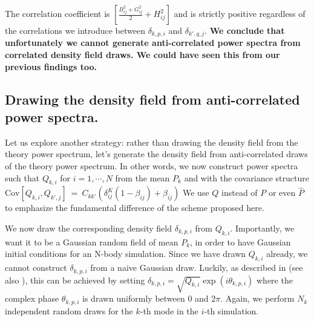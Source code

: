 \documentclass{aastex6}
\newcommand{\eqn}[1]{\begin{eqnarray}#1\end{eqnarray}}
\begin{document}
 

The correlation coefficient is $\left[  \frac{B^2_{ij} + G^2_{ij}}{2}  + H^2_{ij}\right]$ and is strictly positive regardless of the correlations we introduce between $\delta_{k, p, i}$ and $\delta_{k', q, j}$.
\textbf{We conclude that unfortunately we cannot generate anti-correlated power spectra from correlated density field draws. We could have seen this from our previous findings too.}


\subsection{Drawing the density field from anti-correlated power spectra.}

Let us explore another strategy: rather than drawing the density field from the theory power spectrum, let's generate the density field from anti-correlated draws of the theory power spectrum. 
In other words, we now construct power spectra such that $Q_{k, i}$ for $i=1, \cdots, N$ from the mean $P_{k}$ and with the covariance structure $\mathrm{Cov}[{Q}_{k, i}, {Q}_{k', j}] \ = \ C_{kk'} \left( \delta^K_{ij}(1-\beta_{ij}) + \beta_{ij} \right)$
We use $Q$ instead of $P$ or even $\hat{P}$ to emphasize the fundamental difference of the scheme proposed here.

We now draw the corresponding density field $\delta_{k, p, i}$ from $Q_{k, i}$. Importantly, we want it to be a Gaussian random field of mean $P_{k}$, in order to have Gaussian initial conditions for an N-body simulation. 
Since we have drawn $Q_{k, i}$ already, we cannot construct $\delta_{k, p, i}$ from a naive Gaussian draw.
Luckily, as described in \cite{AnguloPontzen2016} (see also \citealt{Schmittfull2015, PradaEtAl2016, DingEtAl2017}), this can be achieved by setting 
$\delta_{k, p, i} = \sqrt{Q_{k, i}} \exp(i\theta_{k, p, i})$
where the complex phase $\theta_{k, p, i}$ is drawn uniformly between $0$ and $2\pi$.
Again, we perform $N_k$ independent random draws for the $k$-th mode in the $i$-th simulation.
\end{document}
